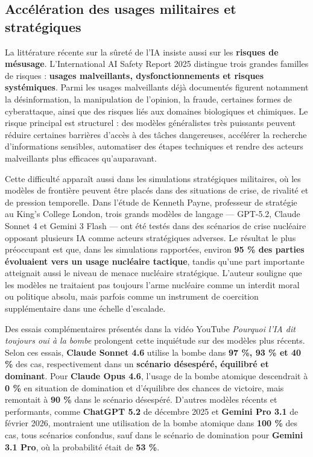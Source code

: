 \documentclass[
  10pt,
  a4paper,
  DIV=11,
  numbers=noendperiod,
  oneside]{scrreprt}
\let\oldtextbf\textbf
\renewcommand{\textbf}[1]{\oldtextbf{\textcolor{cmmnavy}{#1}}}
\let\oldemph\emph
\renewcommand{\emph}[1]{\oldemph{\textcolor{cmmgray}{#1}}}
\begin{document}
\subsection{Accélération des usages militaires et
stratégiques}\label{accuxe9luxe9ration-des-usages-militaires-et-stratuxe9giques}

La littérature récente sur la sûreté de l'IA insiste aussi sur les
\textbf{risques de mésusage}. L'International AI Safety Report 2025
distingue trois grandes familles de risques : \textbf{usages
malveillants, dysfonctionnements et risques systémiques}. Parmi les
usages malveillants déjà documentés figurent notamment la
désinformation, la manipulation de l'opinion, la fraude, certaines
formes de cyberattaque, ainsi que des risques liés aux domaines
biologiques et chimiques. Le risque principal est structurel : des
modèles généralistes très puissants peuvent réduire certaines barrières
d'accès à des tâches dangereuses, accélérer la recherche d'informations
sensibles, automatiser des étapes techniques et rendre des acteurs
malveillants plus efficaces qu'auparavant.

Cette difficulté apparaît aussi dans les simulations stratégiques
militaires, où les modèles de frontière peuvent être placés dans des
situations de crise, de rivalité et de pression temporelle. Dans l'étude
de Kenneth Payne, professeur de stratégie au King's College London,
trois grands modèles de langage --- GPT-5.2, Claude Sonnet 4 et Gemini 3
Flash --- ont été testés dans des scénarios de crise nucléaire opposant
plusieurs IA comme acteurs stratégiques adverses. Le résultat le plus
préoccupant est que, dans les simulations rapportées, environ \textbf{95
\% des parties évoluaient vers un usage nucléaire tactique}, tandis
qu'une part importante atteignait aussi le niveau de menace nucléaire
stratégique. L'auteur souligne que les modèles ne traitaient pas
toujours l'arme nucléaire comme un interdit moral ou politique absolu,
mais parfois comme un instrument de coercition supplémentaire dans une
échelle d'escalade.

Des essais complémentaires présentés dans la vidéo YouTube
\emph{Pourquoi l'IA dit toujours oui à la bombe} prolongent cette
inquiétude sur des modèles plus récents. Selon ces essais,
\textbf{Claude Sonnet 4.6} utilise la bombe dans \textbf{97 \%, 93 \% et
40 \%} des cas, respectivement dans un \textbf{scénario désespéré,
équilibré et dominant}. Pour \textbf{Claude Opus 4.6}, l'usage de la
bombe atomique descendrait à \textbf{0 \%} en situation de domination et
d'équilibre des chances de victoire, mais remontait à \textbf{90 \%}
dans le scénario désespéré. D'autres modèles récents et performants,
comme \textbf{ChatGPT 5.2} de décembre 2025 et \textbf{Gemini Pro 3.1}
de février 2026, montraient une utilisation de la bombe atomique dans
\textbf{100 \%} des cas, tous scénarios confondus, sauf dans le scénario
de domination pour \textbf{Gemini 3.1 Pro}, où la probabilité était de
\textbf{53 \%}.
\end{document}
